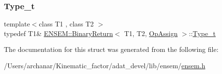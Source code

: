\mbox{\label{structENSEM_1_1BinaryReturn_3_01T1_00_01T2_00_01OpAssign_01_4_a190b733bfdae86d7ca324cd9290b4100}} 
\subsubsection{\texorpdfstring{Type\_t}{Type\_t}\hspace{0.1cm}{\footnotesize\ttfamily [2/2]}}
{\footnotesize\ttfamily template$<$class T1 , class T2 $>$ \\
typedef T1\& \mbox{\hyperlink{structENSEM_1_1BinaryReturn}{E\+N\+S\+E\+M\+::\+Binary\+Return}}$<$ T1, T2, \mbox{\hyperlink{structENSEM_1_1OpAssign}{Op\+Assign}} $>$\+::\mbox{\hyperlink{structENSEM_1_1BinaryReturn_3_01T1_00_01T2_00_01OpAssign_01_4_a190b733bfdae86d7ca324cd9290b4100}{Type\+\_\+t}}}



The documentation for this struct was generated from the following file\+:\begin{DoxyCompactItemize}
\item 
/\+Users/archanar/\+Kinematic\+\_\+factor/adat\+\_\+devel/lib/ensem/\mbox{\hyperlink{lib_2ensem_2ensem_8h}{ensem.\+h}}\end{DoxyCompactItemize}
